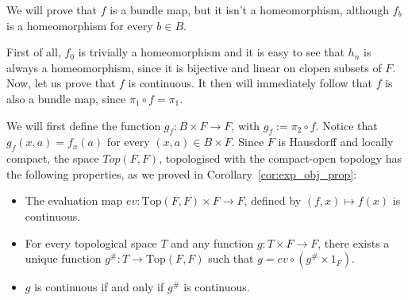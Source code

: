 \begin{example}
\begin{center}
\end{center}
We will prove that $f$ is a bundle map, but it isn't a homeomorphism, although $f_b$ is a homeomorphism for every $b\in B$.

First of all, $f_0$ is trivially a homeomorphism and it is easy to see that $h_n$ is always a homeomorphism, since it is bijective and linear on clopen subsets of $F$. Now, let us prove that $f$ is continuous. It then will immediately follow that $f$ is also a bundle map, since $\pi_1\circ f=\pi_1$.

We will first define the function $g_f:B\times F\to F$, with $g_f:=\pi_2\circ f$. Notice that $g_f(x,a)=f_x(a)$ for every $(x,a)\in B\times F$. Since $F$ is Hausdorff and locally compact, the space $Top(F,F)$, topologised with the compact-open topology has the following properties, as we proved in Corollary~\ref{cor:exp_obj_prop}:
\begin{itemize}
\item The evaluation map $ev:\mathrm{Top}(F,F)\times F\to F$, defined by $(f,x)\mapsto f(x)$ is continuous.
\item For every topological space $T$ and any function $g:T\times F\to F$, there exists a unique function $g^{\#}:T\to\mathrm{Top}(F,F)$ such that $g=ev\circ(g^{\#}\times 1_F)$.
\item $g$ is continuous if and only if $g^{\#}$ is continuous.
\end{itemize}


\end{example}
